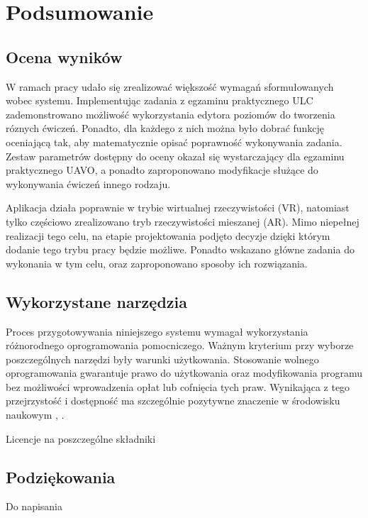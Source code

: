 \newpage
\section{Podsumowanie}

\subsection{Ocena wyników}
W ramach pracy udało się zrealizować większość wymagań sformułowanych wobec systemu. Implementując zadania z egzaminu praktycznego ULC zademonstrowano możliwość wykorzystania edytora poziomów do tworzenia róznych ćwiczeń. Ponadto, dla każdego z nich można było dobrać funkcję oceniającą tak, aby matematycznie opisać poprawność wykonywania zadania. Zestaw parametrów dostępny do oceny okazał się wystarczający dla egzaminu praktycznego UAVO, a ponadto zaproponowano modyfikacje służące do wykonywania ćwiczeń innego rodzaju.

Aplikacja działa poprawnie w trybie wirtualnej rzeczywistości (VR), natomiast tylko częściowo zrealizowano tryb rzeczywistości mieszanej (AR). Mimo niepełnej realizacji tego celu, na etapie projektowania podjęto decyzje dzięki którym dodanie tego trybu pracy będzie możliwe. Ponadto wskazano główne zadania do wykonania w tym celu, oraz zaproponowano sposoby ich rozwiązania.

\subsection{Wykorzystane narzędzia}
Proces przygotowywania niniejszego systemu wymagał wykorzystania różnorodnego oprogramowania pomocniczego. Ważnym kryterium przy wyborze poszczególnych narzędzi były warunki użytkowania. Stosowanie wolnego oprogramowania gwarantuje prawo do użytkowania oraz modyfikowania programu bez możliwości wprowadzenia opłat lub cofnięcia tych praw. Wynikająca z tego przejrzystość i dostępność ma szczególnie pozytywne znaczenie w środowisku naukowym \cite{courant2006}, \cite{lakhan2008}.

\begin{todo}
    Licencje na poszczególne składniki
\end{todo}

\subsection{Podziękowania}
\begin{todo}
    Do napisania
\end{todo}